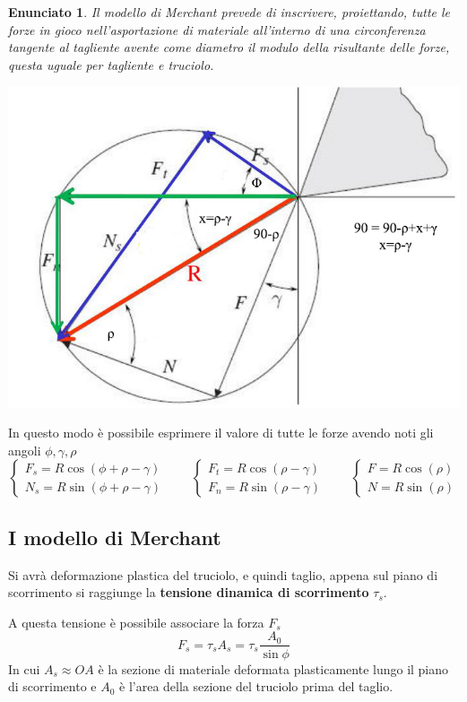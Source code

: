 \documentclass[a4paper, 15pt]{article}
\newtheorem*{en}{Enunciato}
\begin{document}
	\begin{en}
		Il modello di Merchant prevede di inscrivere, proiettando, tutte le forze in gioco nell'asportazione di materiale all'interno di una circonferenza tangente al tagliente avente come diametro il modulo della risultante delle forze, questa uguale per tagliente e truciolo.
	\end{en}
\begin{center}
	\includegraphics[width=0.5\linewidth]{figures/asp9}
\end{center}
	In questo modo è possibile esprimere il valore di tutte le forze avendo noti gli angoli $\phi, \gamma, \rho$
	\begin{equation}\label{eq:15}
		\begin{cases}
		F_s = R\cos(\phi+\rho-\gamma)\\
		N_s = R\sin(\phi+\rho-\gamma)
	\end{cases}\qquad \begin{cases}
	F_t = R\cos(\rho-\gamma)\\
	F_n = R\sin(\rho-\gamma)
	\end{cases}\qquad\begin{cases}
	F = R\cos(\rho)\\
	N = R\sin(\rho)
	\end{cases}
	\end{equation}
\subsection{I modello di Merchant}
	Si avrà deformazione plastica del truciolo, e quindi taglio, appena sul piano di scorrimento si raggiunge la \textbf{tensione dinamica di scorrimento} $\tau_s$.
	
	A questa tensione è possibile associare la forza $F_s$
	\[F_s = \tau_sA_s = \tau_s\dfrac{A_0}{\sin\phi}\]
	In cui $A_s \approx OA$ è la sezione di materiale deformata plasticamente lungo il piano di scorrimento e $A_0$ è l'area della sezione del truciolo prima del taglio. 
	
\end{document}
